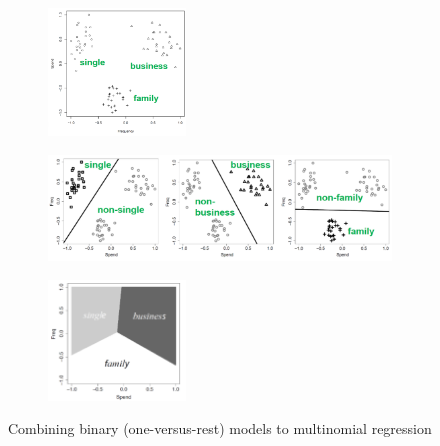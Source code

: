 \begin{figure}[H]
  \centering
  \begin{subfigure}{0.7\textwidth}
    \centering
    \includegraphics[width=0.4\textwidth]{assets/regression/lr__multi_problem.png}
  \end{subfigure}
  \vspace*{0.5cm}

  \begin{subfigure}{0.7\textwidth}
    \centering
    \includegraphics[width=1\textwidth]{assets/regression/lr__multi_binary.png}
  \end{subfigure}
  \vspace*{0.5cm}

  \begin{subfigure}{0.7\textwidth}
    \centering
    \includegraphics[width=0.4\textwidth]{assets/regression/lr__multi_sol.png}
  \end{subfigure}
  \caption{Combining binary (one-versus-rest) models to multinomial regression}
  \label{fig:4_multinomial}
\end{figure}